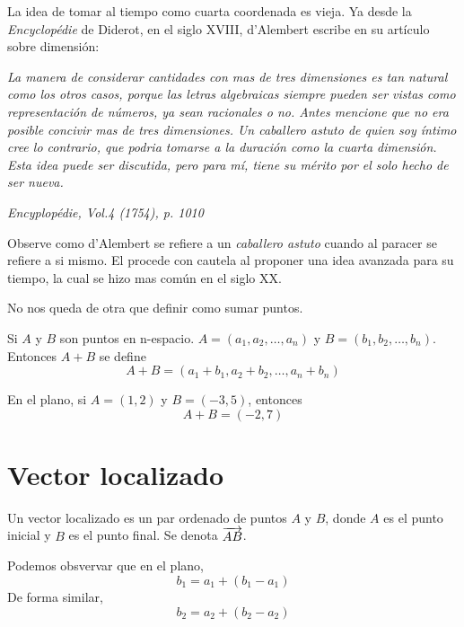La idea de tomar al tiempo como cuarta coordenada es vieja. Ya desde la \emph{Encyclopédie} de Diderot, en
el siglo XVIII, d'Alembert escribe en su artículo sobre dimensión:

\emph{La manera de considerar cantidades con mas de tres dimensiones es tan natural como los otros casos,
porque las letras algebraicas siempre pueden ser vistas como representación de números, ya sean racionales
o no. Antes mencione que no era posible concivir mas de tres dimensiones. Un caballero astuto de quien soy
íntimo cree lo contrario, que podria tomarse a la duración como la cuarta dimensión. Esta idea puede ser
discutida, pero para mí, tiene su mérito por el solo hecho de ser nueva.}

\begin{flushright}
    \emph{Encyplopédie, Vol.4 (1754), p. 1010}
\end{flushright}

Observe como d'Alembert se refiere a un \emph{caballero astuto} cuando al paracer se refiere a si mismo. El procede
con cautela al proponer una idea avanzada para su tiempo, la cual se hizo mas común en el siglo XX.

No nos queda de otra que definir como sumar puntos.

\begin{definition}
    Si $A$ y $B$ son puntos en n-espacio. $A=(a_{1},a_{2},\ldots,a_{n})$ y $B=(b_{1},b_{2},\ldots,b_{n})$. Entonces $A+B$
    se define
    $$ A + B = (a_{1} + b_{1}, a_{2} + b_{2}, \ldots, a_{n} + b_{n}) $$
\end{definition}

\begin{myExample}
    En el plano, si $A=(1,2)$ y $B=(-3,5)$, entonces
    $$ A + B = (-2,7) $$
\end{myExample}

\section{Vector localizado}

\begin{definition}
    Un vector localizado es un par ordenado de puntos $A$ y $B$, donde $A$ es el punto inicial y $B$ es el punto final. Se
    denota $\overrightarrow{AB}$.
\end{definition}

Podemos obsvervar que en el plano,
$$ b_{1} = a_{1} + (b_{1} - a_{1}) $$
De forma similar,
$$ b_{2} = a_{2} + (b_{2} - a_{2}) $$

